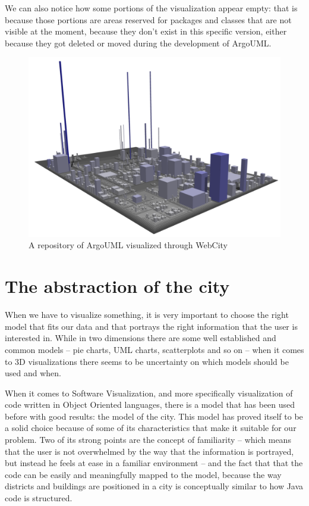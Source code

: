 \documentclass[]{usiinfbachelorproject}
\begin{document}
We can also notice how some portions of the visualization appear empty: that is because those portions are areas reserved for packages and classes that are not visible at the moment, because they don't exist in this specific version, either because they got deleted or moved during the development of ArgoUML.
\begin{figure} [H]
\centering
\includegraphics[width=.8\textwidth]{pictures/example.png}
\caption{A repository of ArgoUML visualized through WebCity}
\label{fig:example}
\end{figure}


\section{The abstraction of the city} \label{The city metaphor}
When we have to visualize something, it is very important to choose the right model that fits our data and that portrays the right information that the user is interested in. While in two dimensions there are some well established and common models -- pie charts, UML charts, scatterplots and so on -- when it comes to 3D visualizations there seems to be uncertainty on which models should be used and when.

When it comes to Software Visualization, and more specifically visualization of code written in Object Oriented languages, there is a model that has been used before\cite{Wett07b} \cite{Wett2008b} \cite{Wett2008a} with good results: the model of the city. This model has proved itself to be a solid choice because of some of its characteristics that make it suitable for our problem. Two of its strong points are the concept of familiarity -- which means that the user is not overwhelmed by the way that the information is portrayed, but instead he feels at ease in a familiar environment -- and the fact that that the code can be easily and meaningfully mapped to the model, because the way districts and buildings are positioned in a city is conceptually similar to how Java code is structured.
\end{document}
